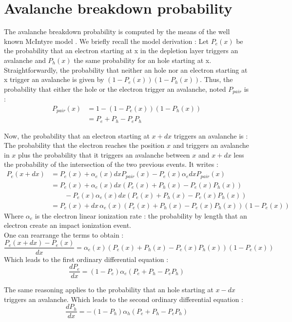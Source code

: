 \documentclass[10pt,a4paper,twocolumn]{article}
\begin{document}
\section{Avalanche breakdown probability}
The avalanche breakdown probability is computed by the means of the well known McIntyre model \cite{oldham_triggering_1972}. We briefly recall the model derivation : 
Let $P_e(x)$ be the probability that an electron starting at x in the depletion layer triggers an avalanche and $P_h(x)$ the same probability for an hole starting at x.
Straightforwardly, the probability that neither an hole nor an electron starting at x trigger an avalanche is given by $(1-P_e(x))(1-P_h(x))$.
Thus, the probability that either the hole or the electron trigger an avalanche, noted $P_{pair}$ is :
\begin{align*}
P_{pair}(x) &= 1 - \left( 1-P_e(x)\right)\left(1-P_h(x)\right)  \\
			&= P_e + P_h - P_e P_h
\end{align*}

Now, the probability that an electron starting at $x+dx$ triggers an avalanche is :
The probability that the electron reaches the position $x$ and triggers an avalanche in $x$ plus the probability that it triggers an avalanche between $x$ and $x+dx$ less the probability of the intersection of the two previous events. It writes : 
\begin{align*}
P_e(x+dx) &= P_e(x) + \alpha_e(x) dx P_{pair}(x)  - P_e(x)  \alpha_e dx P_{pair}(x) \\
		  &= P_e(x) + \alpha_e(x) dx (P_e(x) + P_h(x) - P_e(x) P_h(x)) \\& \qquad - P_e(x) \alpha_e(x) dx (P_e(x) + P_h(x) - P_e(x) P_h(x)) \\
		  &=  P_e(x) + dx \, \alpha_e(x) (P_e(x) + P_h(x) - P_e(x) P_h(x)) (1 - P_e(x))
\end{align*}
Where $\alpha_e$ is the electron linear ionization rate : the probability by length that an electron create an impact ionization event.  \\
One can rearrange the terms to obtain : 
\[ \frac{P_e(x+dx)-P_e(x)}{dx} = \alpha_e(x) (P_e(x) + P_h(x) - P_e(x) P_h(x)) (1 - P_e(x)) \]
Which leads to the first ordinary differential equation : 
\[ \frac{dP_e}{dx} = (1-P_e)\alpha_e(P_e + P_h - P_e  P_h) \]

The same reasoning applies to the probability that an hole starting at $x-dx$ triggers an avalanche.
Which leads to the second ordinary differential equation : 
\[ \frac{dP_h}{dx} = -(1-P_h)\alpha_h(P_e + P_h - P_e  P_h) \]
\end{document}
